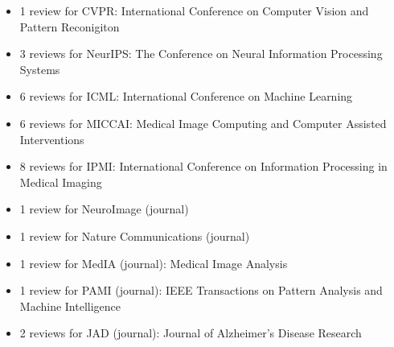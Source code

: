 \documentclass[11pt]{article}
\begin{document}
 \vspace{-7em}
 \begin{itemize}
  \item 1 review for CVPR: International Conference on Computer Vision and Pattern Reconigiton
  \item 3 reviews for NeurIPS: The Conference on Neural Information Processing Systems
  \item 6 reviews for ICML: International Conference on Machine Learning
  \item 6 reviews for MICCAI: Medical Image Computing and Computer Assisted Interventions
  \item 8 reviews for IPMI: International Conference on Information Processing in Medical Imaging
  \item 1 review for NeuroImage (journal) 
  \item 1 review for Nature Communications (journal)
  \item 1 review for MedIA (journal): Medical Image Analysis
  \item 1 review for PAMI (journal): IEEE Transactions on Pattern Analysis and Machine Intelligence
  \item 2 reviews for JAD (journal): Journal of Alzheimer's Disease Research
 \end{itemize}
 
\end{document}
